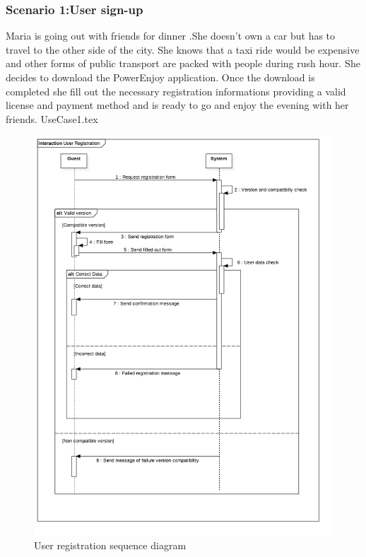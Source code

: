 \documentclass[12pt]{article}
\begin{document}
 	 	\subsubsection{Scenario 1:User sign-up}
 	 	Maria is going out with friends for dinner .She doesn't own a 
 	 	car but has to travel to the other side of the city. She knows that a taxi ride  
 	 	would be expensive and other forms of public transport are packed with people during
 	 	rush hour. She decides to download the PowerEnjoy application. Once the download is 
 	 	completed she fill out the necessary registration informations providing a valid 
 	 	license and payment method and is ready to go and enjoy the evening with her friends.
 	 	\FloatBarrier
		{UseCase1.tex} 	 	
		\newpage
		\setcounter{figure}{0}    
		\begin{figure}[htbp]
		 \caption{User registration sequence diagram}
		\includegraphics[scale=0.49]{Images/SequenceDiagram/UserRegistration.png}
 	 	\end{figure}
 	 	\clearpage
 	 	
\end{document}
